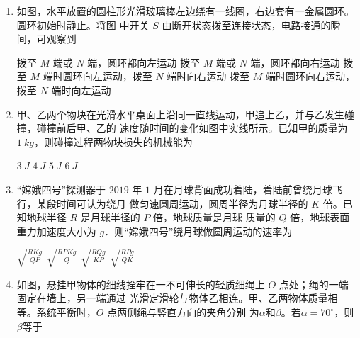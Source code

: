 

\gaokaoxz
\begin{enumerate}
\item
如图，水平放置的圆柱形光滑玻璃棒左边绕有一线圈，右边套有一金属圆环。圆环初始时静止。将图
中开关 $ S $ 由断开状态拨至连接状态，电路接通的瞬间，可观察到  
\begin{figure}[h!]
\centering

\end{figure}


\fourchoices
{拨至 $ M $ 端或 $ N $ 端，圆环都向左运动}
{拨至 $ M $ 端或 $ N $ 端，圆环都向右运动}
{拨至 $ M $ 端时圆环向左运动，拨至 $ N $ 端时向右运动}
{拨至 $ M $ 端时圆环向右运动，拨至 $ N $ 端时向左运动}


\item
甲、乙两个物块在光滑水平桌面上沿同一直线运动，甲追上乙，并与乙发生碰撞，碰撞前后甲、乙的
速度随时间的变化如图中实线所示。已知甲的质量为 $ 1 \ kg $，则碰撞过程两物块损失的机械能为  
\begin{figure}[h!]
\centering

\end{figure}


\fourchoices
{$ 3 \ J $}
{$ 4 \ J $}
{$ 5 \ J $}
{$ 6 \ J $}


\item
“嫦娥四号”探测器于 $ 2019 $ 年 $ 1 $ 月在月球背面成功着陆，着陆前曾绕月球飞行，某段时间可认为绕月
做匀速圆周运动，圆周半径为月球半径的 $ K $ 倍。已知地球半径 $ R $ 是月球半径的 $ P $ 倍，地球质量是月球
质量的 $ Q $ 倍，地球表面重力加速度大小为 $ g $．则“嫦娥四号”绕月球做圆周运动的速率为  

\fourchoices
{$\sqrt{\frac{R K g}{Q P}}$}
{$\sqrt{\frac{R P K g}{Q}}$}
{$ \sqrt{\frac{R Q g}{K P}}$}
{$\sqrt{\frac{R P g}{Q K}}$}








\item
如图，悬挂甲物体的细线拴牢在一不可伸长的轻质细绳上 $ O $ 点处；绳的一端固定在墙上，另一端通过
光滑定滑轮与物体乙相连。甲、乙两物体质量相等。系统平衡时，$ O $ 点两侧绳与竖直方向的夹角分别
为$ \alpha $和$ \beta $。若$ \alpha =70 ^{ \circ } $，则$ \beta $等于  
\begin{figure}[h!]
\centering

\end{figure}



\end{enumerate}
